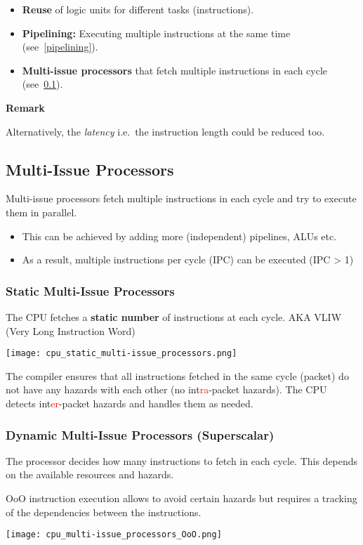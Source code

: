 \begin{itemize}
    \item \textbf{Reuse} of logic units for different tasks (instructions).
    \item \textbf{Pipelining:} Executing multiple instructions at the same time (see~\ref{pipelining}).
    \item \textbf{Multi-issue processors} that fetch multiple instructions in each cycle (see~\ref{multi-issue processors}).
\end{itemize}

\textbf{Remark}

Alternatively, the \textit{latency} i.e.\ the instruction length could be reduced too.

\subsection{Multi-Issue Processors}\label{multi-issue processors}
Multi-issue processors fetch multiple instructions in each cycle and try to execute them in parallel.
\begin{itemize}
    \item This can be achieved by adding more (independent) pipelines, ALUs etc.
    \item As a result, multiple instructions per cycle (IPC) can be executed (IPC > 1)
\end{itemize}
\subsubsection{Static Multi-Issue Processors}
The CPU fetches a \textbf{static number} of instructions at each cycle. AKA VLIW (Very Long Instruction Word)

\texttt{[image: cpu\_static\_multi-issue\_processors.png]}

The compiler ensures that all instructions fetched in the same cycle (packet) do not have any hazards with each other (no int\textcolor{red}{ra}-packet hazards). The CPU detects int\textcolor{red}{er}-packet hazards and handles them as needed.

\subsubsection{Dynamic Multi-Issue Processors (Superscalar)}
The processor decides how many instructions to fetch in each cycle. This depends on the available resources and hazards.
\newpar{}

OoO instruction execution allows to avoid certain hazards but requires a tracking of the dependencies between the instructions.
\begin{center}
    \texttt{[image: cpu\_multi-issue\_processors\_OoO.png]}
\end{center}
